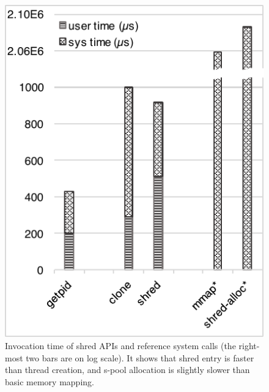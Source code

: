 \begin{figure}[htbp]
	\centering
	\begin{minipage}[b]{0.4\textwidth}
		\centering	
\includegraphics[scale=0.85]{shreds/figures/prim_compare}
\caption{Invocation time of shred APIs and reference system calls (the right-most two bars are on log scale). It shows that shred entry is faster than thread creation, and s-pool allocation is slightly slower than basic memory mapping.}
\label{fig:primitive}
	\end{minipage}
 \hfill
	\begin{minipage}[b]{0.4\textwidth}
		\centering	

\end{minipage}
\end{figure}

